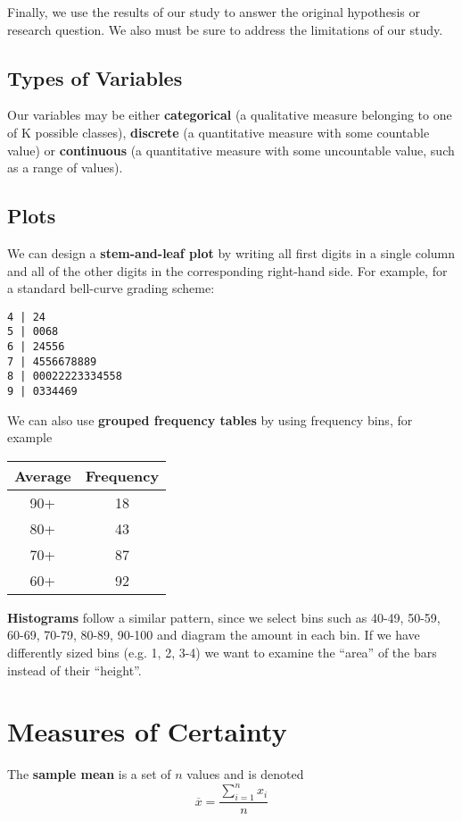 \documentclass[12pt]{article}
\begin{document}
Finally, we use the results of our study to answer the original hypothesis or research question. We also must be sure to address the limitations of our study.

\subsection*{Types of Variables}
Our variables may be either {\bf categorical} (a qualitative measure belonging to one of K possible classes), {\bf discrete} (a quantitative measure with some countable value) or {\bf continuous} (a quantitative measure with some uncountable value, such as a range of values).

\subsection*{Plots}
We can design a {\bf stem-and-leaf plot} by writing all first digits in a single column and all of the other digits in the corresponding right-hand side. For example, for a standard bell-curve grading scheme:

\begin{verbatim}
4 | 24
5 | 0068
6 | 24556
7 | 4556678889
8 | 00022223334558
9 | 0334469
\end{verbatim}

We can also use {\bf grouped frequency tables} by using frequency bins, for example

\begin{table}[ht]
\centering
\begin{tabular}{|c|c|}
  \hline
  Average & Frequency \\ \hline
  90+ & 18 \\
  80+ & 43 \\
  70+ & 87 \\
  60+ & 92 \\ \hline
  \end{tabular}
\end{table}

{\bf Histograms} follow a similar pattern, since we select bins such as 40-49, 50-59, 60-69, 70-79, 80-89, 90-100 and diagram the amount in each bin. If we have differently sized bins (e.g. 1, 2, 3-4) we want to examine the ``area'' of the bars instead of their ``height''.

\section*{Measures of Certainty}
The {\bf sample mean} is a set of $n$ values and is denoted \[ \overline{x} = \frac{\displaystyle\sum_{i=1}^n x_i}{n} \]
\end{document}
